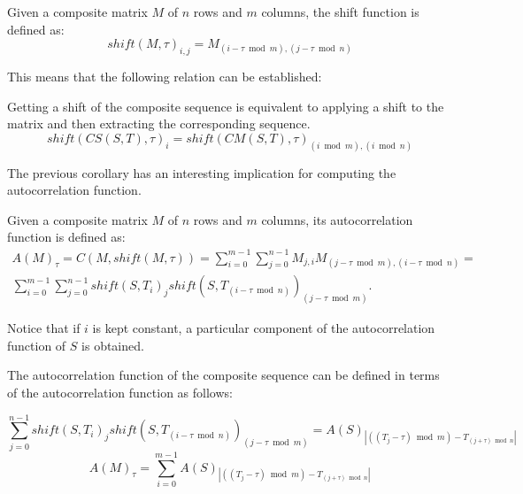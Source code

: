 \begin{definition}\label{definition:composition:shift}
  Given a composite matrix $M$ of $n$ rows and $m$ columns, the shift function
  is defined as:
  \begin{equation}
    shift(M, \tau)_{i, j} = M_{(i-\tau \bmod m), (j-\tau \bmod n)}
  \end{equation}
\end{definition}
This means that the following relation can be established:
  \begin{corollary} Getting a shift of the composite sequence is equivalent to
  applying a shift to the matrix and then extracting the corresponding
  sequence.
    \begin{equation}
      shift(CS(S, T), \tau)_{i} = shift(CM(S, T), \tau)_{(i \bmod m), (i \bmod n)}
    \end{equation}
  \end{corollary}

The previous corollary has an interesting implication for computing the autocorrelation function.

\begin{corollary}
  Given a composite matrix $M$ of $n$ rows and $m$ columns, its
  autocorrelation function is defined as:
  \begin{equation}
    \begin{split}
      A(M)_{\tau} = C(M, shift(M, \tau)) = \sum_{i=0}^{m-1}\sum_{j=0}^{n-1}M_{j, i}M_{(j-\tau \bmod m),(i - \tau \bmod n)} = \\
      \sum_{i=0}^{m-1}\sum_{j=0}^{n-1}shift(S, T_{i})_{j}shift(S, T_{(i - \tau \bmod n)})_{(j-\tau \bmod m)}.
    \end{split}
  \end{equation}
\end{corollary}

Notice that if $i$ is kept constant, a particular component of the
autocorrelation function of $S$ is obtained.

\begin{property} \label{composition:prop:1}
The autocorrelation function of the composite
sequence can be defined in terms of the autocorrelation function as follows:

\begin{equation}
  \sum_{j=0}^{n-1}shift(S, T_{i})_{j}shift(S, T_{(i - \tau \bmod n)})_{(j-\tau \bmod m)} = A(S)_{|((T_{j} - \tau) \bmod m) - T_{(j + \tau) \bmod n}|}
\end{equation}
\begin{equation}
  A(M)_{\tau} = \sum_{i=0}^{m-1} A(S)_{|((T_{j} - \tau) \bmod m) - T_{(j + \tau) \bmod n}|}
\end{equation}

\end{property}

